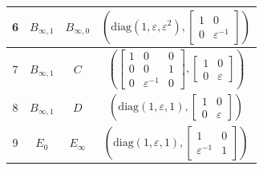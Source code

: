 \documentclass[12pt]{amsart}
\newcommand{\diag}{\mathrm{diag}}
\begin{document}
\begin{table}[ht]
{\begin{tabular}{|c||c||c||c|}
6 & $B_{\infty, 1}$ & $B_{\infty,0}$ & 
$\left(\diag(1, \varepsilon, \varepsilon^2),\begin{bmatrix} 1&0\\ 0&\varepsilon^{-1} \end{bmatrix}\right)$  \\
\hline
7 & $B_{\infty, 1}$ & $C$ & 
$\left(\begin{bmatrix}1&0&0\\0&0&1 \\ 0&\varepsilon^{-1}&0\end{bmatrix},
\begin{bmatrix} 1&0\\ 0&\varepsilon \end{bmatrix}\right)$\\ 
\hline
8 & $B_{\infty,1}$ & $D$ & 
$\left(\diag(1,\varepsilon,1) , \begin{bmatrix} 1&0\\ 0&\varepsilon \end{bmatrix}\right)$\\ 
\hline
9 & $E_0$ & $E_\infty$ & 
$\left(\diag(1, \varepsilon, 1), \begin{bmatrix} 1&0\\ \varepsilon^{-1}&1 \end{bmatrix}\right)$ \\
\hline
\end{tabular}
}
\end{table}


\newpage
\end{document}
